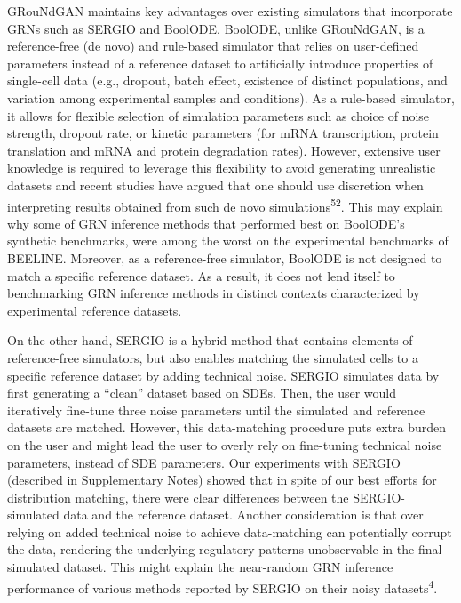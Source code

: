 GRouNdGAN maintains key advantages over existing simulators that incorporate GRNs such as SERGIO and BoolODE. BoolODE, unlike GRouNdGAN, is a reference-free (de novo) and rule-based simulator that relies on user-defined parameters instead of a reference dataset to artificially introduce properties of single-cell data (e.g., dropout, batch effect, existence of distinct populations, and variation among experimental samples and conditions). As a rule-based simulator, it allows for flexible selection of simulation parameters such as choice of noise strength, dropout rate, or kinetic parameters (for mRNA transcription, protein translation and mRNA and protein degradation rates). However, extensive user knowledge is required to leverage this flexibility to avoid generating unrealistic datasets and recent studies have argued that one should use discretion when interpreting results obtained from such de novo simulations\textsuperscript{52}. This may explain why some of GRN inference methods that performed best on BoolODE’s synthetic benchmarks, were among the worst on the experimental benchmarks of BEELINE. Moreover, as a reference-free simulator, BoolODE is not designed to match a specific reference dataset. As a result, it does not lend itself to benchmarking GRN inference methods in distinct contexts characterized by experimental reference datasets.

On the other hand, SERGIO is a hybrid method that contains elements of reference-free simulators, but also enables matching the simulated cells to a specific reference dataset by adding technical noise. SERGIO simulates data by first generating a “clean” dataset based on SDEs. Then, the user would iteratively fine-tune three noise parameters until the simulated and reference datasets are matched. However, this data-matching procedure puts extra burden on the user and might lead the user to overly rely on fine-tuning technical noise parameters, instead of SDE parameters. Our experiments with SERGIO (described in Supplementary Notes) showed that in spite of our best efforts for distribution matching, there were clear differences between the SERGIO-simulated data and the reference dataset. Another consideration is that over relying on added technical noise to achieve data-matching can potentially corrupt the data, rendering the underlying regulatory patterns unobservable in the final simulated dataset. This might explain the near-random GRN inference performance of various methods reported by SERGIO on their noisy datasets\textsuperscript{4}.

